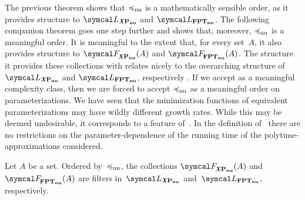 The previous theorem shows that $\preccurlyeq_\mathrm{nu}$ is a mathematically sensible order, as it provides structure to $\calL_\clXnu{P}$ and $\calL_\clnu{FPT}$.
The following companion theorem goes one step further and shows that, moreover, $\preccurlyeq_\mathrm{nu}$ is a meaningful order.
It is meaningful to the extent that, for every set~$A$, it also provides structure to $\calF_\clXnu{P}(A)$ and $\calF_\clnu{FPT}(A)$.
The structure it provides these collections with relates nicely to the overarching structure of $\calL_\clXnu{P}$ and $\calL_\clnu{FPT}$, respectively \parencite[see also][]{davey2002introduction,abramsky1994domain}.
If we accept  as a meaningful complexity class, then we are forced to accept $\preccurlyeq_\mathrm{nu}$ as a meaningful order on parameterizations.
We have seen that the minimization functions of equivalent parameterizations may have wildly different growth rates.
While this may be deemed undesirable, it corresponds to a feature of~.
In the definition of~ there are no restrictions on the parameter-dependence of the running time of the polytime-approximations considered.
\begin{theorem}
\label{thm:nufilter}%
  Let $A$ be a set.
  Ordered by~$\preccurlyeq_\mathrm{nu}$, the collections $\calF_\clXnu{P}(A)$ and $\calF_\clnu{FPT}(A)$ are filters in~$\calL_\clXnu{P}$ and~$\calL_\clnu{FPT}$, respectively.
\end{theorem}
